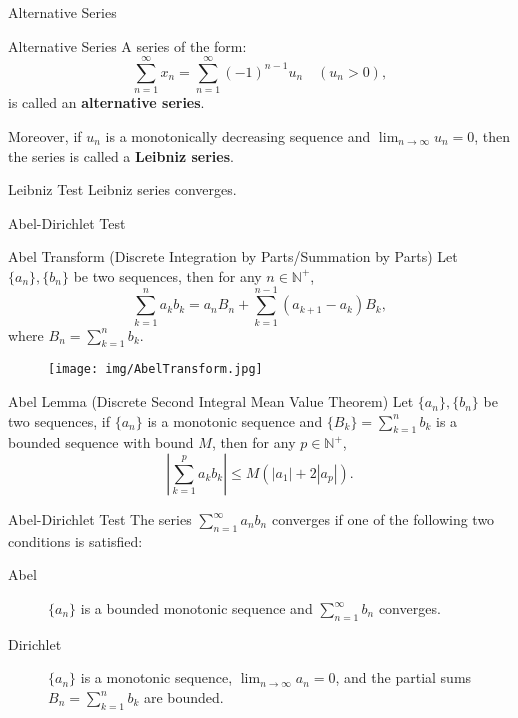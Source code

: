 \documentclass[11pt]{../../TexTemplate/elegantbook}
\begin{document}
\begin{leftbarTitle}{Alternative Series}\end{leftbarTitle}
\begin{definition}{Alternative Series}
    A series of the form:
    \[
    \sum_{n=1}^{\infty}x_{n} = 
    \sum_{n=1}^{\infty} (-1)^{n-1} u_n\quad (u_{n}>0),
    \]
    is called an \textbf{alternative series}.

    Moreover, if \( u_n \) is a monotonically decreasing sequence and \( \lim_{n \to \infty} u_n = 0 \), 
    then the series is called a \textbf{Leibniz series}.
\end{definition}

\begin{theorem}{Leibniz Test}
    Leibniz series converges.
\end{theorem}


\begin{leftbarTitle}{Abel-Dirichlet Test}\end{leftbarTitle}

\begin{theorem}{Abel Transform (Discrete Integration by Parts/Summation by Parts)}\label{thm:Abel Transform}
    Let \(\{a_n\}, \{b_n\}\) be two sequences, then for any \(n\in \mathbb{N}^{+}\),
    \[
        \sum_{k=1}^{n} a_k b_k = a_n B_n + \sum_{k=1}^{n-1} (a_{k+1} - a_{k})B_k,
    \]
    where \(B_n = \sum_{k=1}^{n} b_k\).
\end{theorem}

\begin{figure}[h]
    \centering
    \texttt{[image: img/AbelTransform.jpg]}
\end{figure}

\begin{lemma}{Abel Lemma (Discrete Second Integral Mean Value Theorem)}
    Let \(\{a_n\}, \{b_n\}\) be two sequences, if \(\{a_n\}\) is a monotonic sequence 
    and \(\{B_k\} = \sum_{k=1}^{n} b_k\) is a bounded sequence with bound \(M\),
    then for any \(p\in \mathbb{N}^{+}\),
    \[
        \left| \sum_{k=1}^{p} a_k b_k \right| \leqslant M \left( |a_{1}| + 2|a_{p}| \right) .
    \]
\end{lemma}

\begin{theorem}{Abel-Dirichlet Test}
    The series \(\sum_{n=1}^{\infty} a_n b_n\) converges if one of the following two conditions is satisfied:
    \begin{description}
        \item[Abel] \(\{a_n\}\) is a bounded monotonic sequence and \(\sum_{n=1}^{\infty} b_n\) converges.
        \item[Dirichlet]  \(\{a_n\}\) is a monotonic sequence, \(\lim_{n \to \infty} a_n = 0\),
            and the partial sums \(B_n = \sum_{k=1}^{n} b_k\) are bounded.       
    \end{description}
\end{theorem}
\end{document}
